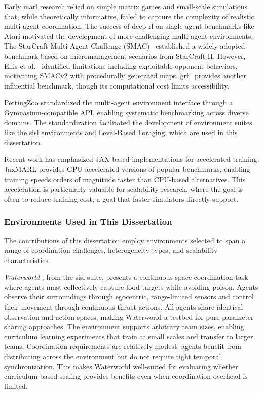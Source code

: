 Early \gls{marl} research relied on simple matrix games and 
small-scale simulations that, while theoretically informative, 
failed to capture the complexity of realistic multi-agent coordination. 
The success of deep \gls{rl} on single-agent benchmarks like Atari 
motivated the development of more challenging multi-agent environments.
The StarCraft Multi-Agent Challenge (SMAC)~\cite{samvelyan2019} established a 
widely-adopted benchmark based on micromanagement scenarios from StarCraft II. 
However, Ellis et al.~\cite{ellis2023} identified limitations including 
exploitable opponent behaviors, motivating SMACv2 with procedurally generated maps. 
\Gls{grf}~\cite{kurach2020} provides another influential benchmark, 
though its computational cost limits accessibility.

PettingZoo \cite{terry2021} standardized the multi-agent environment 
interface through a Gymnasium-compatible API, enabling systematic 
benchmarking across diverse domains. 
The standardization facilitated the development of environment 
suites like the \gls{sisl} environments and Level-Based Foraging, 
which are used in this dissertation.

Recent work has emphasized JAX-based implementations for accelerated training. 
JaxMARL \cite{rutherford2023} provides GPU-accelerated versions of popular benchmarks,
enabling training speeds orders of magnitude faster than CPU-based alternatives. 
This acceleration is particularly valuable for scalability research, 
where the goal is often to reduce training cost; 
a goal that faster simulators directly support.

\subsubsection{Environments Used in This Dissertation}
\label{subsubsec:environments}

The contributions of this dissertation employ environments 
selected to span a range of coordination challenges, 
heterogeneity types, and scalability characteristics.

\textit{Waterworld} \cite{gupta2017}, from the \gls{sisl} suite, 
presents a continuous-space coordination task where agents must 
collectively capture food targets while avoiding poison. 
Agents observe their surroundings through egocentric, range-limited 
sensors and control their movement through continuous thrust actions. 
All agents share identical observation and action spaces, 
making Waterworld a testbed for pure parameter sharing approaches. 
The environment supports arbitrary team sizes, enabling curriculum 
learning experiments that train at small scales and transfer to larger teams. 
Coordination requirements are relatively modest: agents benefit from distributing 
across the environment but do not require tight temporal synchronization. 
This makes Waterworld well-suited for evaluating whether curriculum-based 
scaling provides benefits even when coordination overhead is limited.

